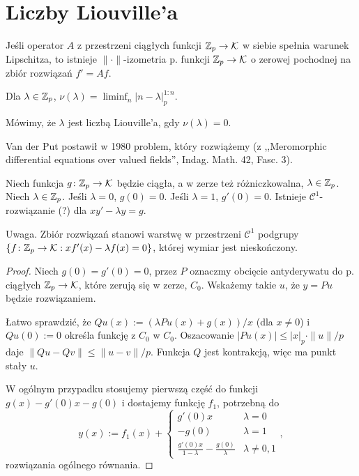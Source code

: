 \section{Liczby Liouville'a}
\begin{fakt} %
	Jeśli operator $A$ z przestrzeni ciągłych funkcji $\mathbb Z_p \to \mathcal K$ w siebie spełnia warunek Lipschitza, to istnieje $\|\cdot\|$-izometria p. funkcji $\mathbb Z_p \to \mathcal K$ o zerowej pochodnej na zbiór rozwiązań $f' = Af$.
\end{fakt}

\begin{definicja}
	Dla $\lambda \in \mathbb Z_p$, $\nu(\lambda) = \liminf_n |n - \lambda|_p^{1:n}$.
\end{definicja}

\begin{definicja}
	Mówimy, że $\lambda$ jest liczbą Liouville'a, gdy $\nu(\lambda) = 0$.
\end{definicja}

Van der Put postawił w 1980 problem, który rozwiążemy (z ,,Meromorphic differential equations over valued fields'', Indag. Math. 42, Fasc. 3).

\begin{fakt}
	Niech funkcja $g \colon \mathbb Z_p \to \mathcal K$ będzie ciągła, a w zerze też różniczkowalna, $\lambda \in \mathbb Z_p$.
	Niech $\lambda \in \mathbb Z_p$.
	Jeśli $\lambda = 0$, $g(0) = 0$.
	Jeśli $\lambda = 1$, $g'(0) = 0$.
	Istnieje $\mathcal C^1$-rozwiązanie (?) dla $x y' - \lambda y = g$.
\end{fakt}

Uwaga. 
Zbiór rozwiązań stanowi warstwę w przestrzeni $\mathcal C^1$ podgrupy $\{f \colon \mathbb Z_p \to \mathcal K : xf'(x) - \lambda f(x) = 0\}$, której wymiar jest nieskończony.

\begin{proof}
	Niech $g(0) = g'(0) = 0$, przez $P$ oznaczmy obcięcie antyderywatu do p. ciągłych $\mathbb Z_p \to \mathcal K$, które zerują się w zerze, $C_0$.
	Wskażemy takie $u$, że $y = Pu$ będzie rozwiązaniem.

	Łatwo sprawdzić, że $Qu(x) := (\lambda Pu(x) + g(x))/x$ (dla $x \neq 0$) i $Qu(0) := 0$ określa funkcję z $C_0$ w $C_0$.
	Oszacowanie $|Pu(x)| \le |x|_p \cdot \|u\| / p$ daje $\|Qu - Qv\| \le \|u - v\| / p$.
	Funkcja $Q$ jest kontrakcją, więc ma punkt stały $u$.

	W ogólnym przypadku stosujemy pierwszą część do funkcji $g(x) - g'(0) x - g(0)$ i dostajemy funkcję $f_1$, potrzebną do
	\[
		y(x) := f_1(x) + \begin{cases}
		g'(0)x & \lambda = 0 \\
		-g(0) & \lambda = 1 \\
		\frac{g'(0) x}{1-  \lambda} - \frac{g(0)}{\lambda} & \lambda \neq 0, 1 \end{cases},
	\]
	rozwiązania ogólnego równania.
\end{proof}


